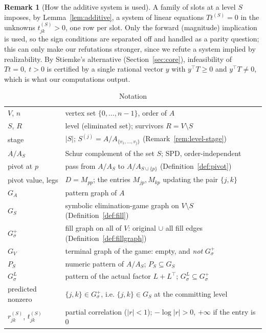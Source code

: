 \documentclass[11pt]{article}
\theoremstyle{plain}
\theoremstyle{definition}
\newtheorem{remark}[theorem]{Remark}
\begin{document}
\begin{aiblock}
\begin{remark}[How the additive system is used]\label{rem:additive-use}
A family of slots at a level $S$ imposes, by Lemma~\ref{lem:additive}, a system of linear equations
$Tt^{(S)}=0$ in the unknowns $t^{(S)}_{jk}>0$, one row per slot. Only the forward (magnitude)
implication is used, so the sign conditions are separated off and handled as a parity question; this
can only make our refutations stronger, since we refute a system implied by realizability. By
Stiemke's alternative (Section~\ref{sec:core}), infeasibility of $Tt=0,\ t>0$ is certified by a single
rational vector $y$ with $y^\top T\ge0$ and $y^\top T\neq0$, which is what our computations output.
\end{remark}

\begin{table}[H]
\centering
\caption{Notation}
\label{tab:notation}
\begin{tabular}{ll}
\toprule
$V$, $n$ & vertex set $\{0,\dots,n-1\}$, order of $A$\\
$S$, $R$ & level (eliminated set); survivors $R=V\setminus S$\\
stage & $|S|$; $S^{(j)}=A/A_{\{v_1,\dots,v_j\}}$ (Remark~\ref{rem:level-stage})\\
$A/A_S$ & Schur complement of the set $S$; SPD, order-independent\\
pivot at $p$ & pass from $A/A_S$ to $A/A_{S\cup\{p\}}$ (Definition~\ref{def:pivot})\\
pivot value, legs & $D=M_{pp}$; the entries $M_{jp},M_{kp}$ updating the pair $\{j,k\}$\\
$G_A$ & pattern graph of $A$\\
$G_S$ & symbolic elimination-game graph on $V\setminus S$ (Definition~\ref{def:fill})\\
$G^+_\sigma$ & fill graph on all of $V$: original $\cup$ all fill edges (Definition~\ref{def:fillgraph})\\
$G_V$ & terminal graph of the game: empty, and \emph{not} $G^+_\sigma$\\
$P_S$ & numeric pattern of $A/A_S$; $P_S\subseteq G_S$\\
$G^L_\sigma$ & pattern of the actual factor $L+L^\top$; $G^L_\sigma\subseteq G^+_\sigma$\\
predicted nonzero & $\{j,k\}\in G^+_\sigma$, i.e. $\{j,k\}\in G_S$ at the committing level\\
$r^{(S)}_{jk}$, $t^{(S)}_{jk}$ & partial correlation ($|r|<1$); $-\log|r|>0$, $+\infty$ if the entry is $0$\\

\end{tabular}
\end{table}
\end{aiblock}
\end{document}
